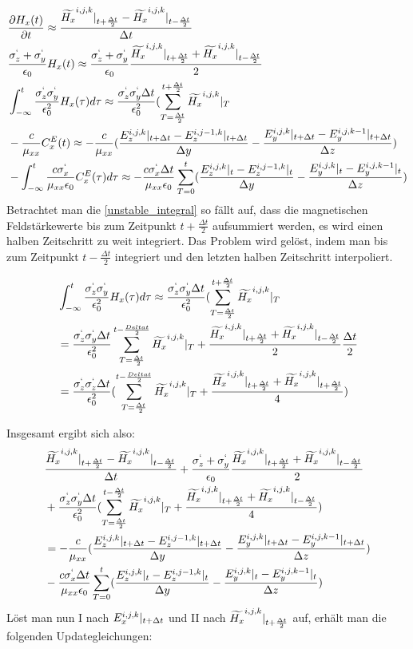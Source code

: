\documentclass[11pt, ngerman]{article}
\begin{document}
\begin{align}
	&\frac{\partial H_x(t)}{\partial t} \approx \frac{\Hf{x}{i,j,k}{+} - \Hf{x}{i,j,k}{-}}{\Delta t}\\
	&\frac{\sgma_z + \sgma_y}{\epsilon_0}H_x(t) \approx \frac{\sgma_z + \sgma_y}{\epsilon_0}\frac{\Hf{x}{i,j,k}{+} + \Hf{x}{i,j,k}{-}}{2}\\
	&\int_{-\infty}^t\frac{\sgma_z\sgma_y}{\epsilon_0^2}H_x(\tau)d\tau \approx \frac{\sgma_z\sgma_y\Delta t}{\epsilon_0^2}(\sum_{T=\frac{\Delta t}{2}}^{t+\frac{\Delta t}{2}}\Hf{x}{i,j,k}{T}\label{unstable_integral}\\
	&-\frac{c}{\mu_{xx}}C_x^E(t) \approx -\frac{c}{\mu_{xx}}(\frac{\Ef{z}{i,j,k}{+} - \Ef{z}{i,j-1,k}{+}}{\Delta y} - \frac{\Ef{y}{i,j,k}{+} - \Ef{y}{i,j,k-1}{+}}{\Delta z})\\
	&-\int_{-\infty}^t\frac{c\sgma_x}{\mu_{xx}\epsilon_0}C_x^E(\tau)d\tau \approx -\frac{c\sgma_x\Delta t}{\mu_{xx}\epsilon_0}\sum_{T = 0}^t(\frac{\Ef{z}{i,j,k}{0}-\Ef{z}{i,j-1,k}{0}}{\Delta y}-\frac{\Ef{y}{i,j,k}{0}-\Ef{y}{i,j,k-1}{0}}{\Delta z})
\end{align}
Betrachtet man die \cref{unstable_integral} so f\"allt auf, dass die magnetischen Feldst\"arkewerte bis zum Zeitpunkt \(t+\frac{\Delta t}{2}\) aufsummiert werden, es wird einen
halben Zeitschritt zu weit integriert. Das Problem wird gel\"ost, indem man bis zum Zeitpunkt \(t - \frac{\Delta t}{2}\) integriert und den letzten halben Zeitschritt interpoliert.

\begin{align}
	&\int_{-\infty}^t\frac{\sgma_z\sgma_y}{\epsilon_0^2}H_x(\tau)d\tau \approx \frac{\sgma_z\sgma_y\Delta t}{\epsilon_0^2}(\sum_{T=\frac{\Delta t}{2}}^{t+\frac{\Delta t}{2}}\Hf{x}{i,j,k}{T}\nonumber\\
	& = \frac{\sgma_z\sgma_y\Delta t}{\epsilon_0^2}\sum_{T=\frac{\Delta t}{2}}^{t-\frac{Delta t}{2}}\Hf{x}{i,j,k}{T} + \frac{\Hf{x}{i,j,k}{+}+\Hf{x}{i,j,k}{-}}{2}\frac{\Delta t}{2}\nonumber\\
	& = \frac{\sgma_z\sgma_z\Delta t}{\epsilon_0^2}(\sum_{T=\frac{\Delta t}{2}}^{t-\frac{Delta t}{2}}\Hf{x}{i,j,k}{T} + \frac{\Hf{x}{i,j,k}{+} + \Hf{x}{i,j,k}{+}}{4})
\end{align}

Insgesamt ergibt sich also:
\begin{align}
	&\frac{\Hf{x}{i,j,k}{+} - \Hf{x}{i,j,k}{-}}{\Delta t} + \frac{\sgma_z + \sgma_y}{\epsilon_0}\frac{\Hf{x}{i,j,k}{+} + \Hf{x}{i,j,k}{-}}{2}\nonumber\\
	&+\frac{\sgma_z\sgma_y\Delta t}{\epsilon_0^2}(\sum_{T=\frac{\Delta t}{2}}^{t-\frac{\Delta t}{2}}\Hf{x}{i,j,k}{T} + \frac{\Hf{x}{i,j,k}{+} + \Hf{x}{i,j,k}{-}}{4})\nonumber\\
	&= -\frac{c}{\mu_{xx}}(\frac{\Ef{z}{i,j,k}{+} - \Ef{z}{i,j-1,k}{+}}{\Delta y} - \frac{\Ef{y}{i,j,k}{+} - \Ef{y}{i,j,k-1}{+}}{\Delta z})\nonumber\\
	&-\frac{c\sgma_x\Delta t}{\mu_{xx}\epsilon_0}\sum_{T = 0}^t(\frac{\Ef{z}{i,j,k}{0}-\Ef{z}{i,j-1,k}{0}}{\Delta y}-\frac{\Ef{y}{i,j,k}{0}-\Ef{y}{i,j,k-1}{0}}{\Delta z})
\end{align}
L\"ost man nun I nach \(\Ef{x}{i,j,k}{+}\) und II nach \(\Hf{x}{i,j,k}{+}\) auf, erh\"alt man die folgenden Updategleichungen:
\end{document}
